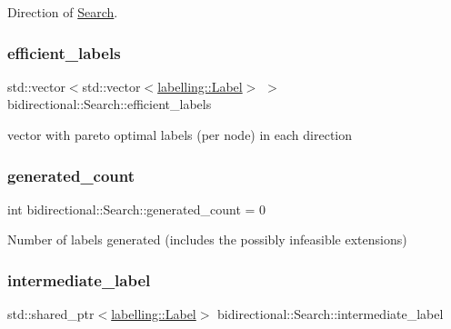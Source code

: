 Direction of \hyperlink{classbidirectional_1_1Search}{Search}. 

\mbox{\label{classbidirectional_1_1Search_aa9159c191cdef5d5555614b9efcb8dc5}} 
\subsubsection{\texorpdfstring{efficient\+\_\+labels}{efficient\_labels}}
{\footnotesize\ttfamily std\+::vector$<$std\+::vector$<$\hyperlink{classlabelling_1_1Label}{labelling\+::\+Label}$>$ $>$ bidirectional\+::\+Search\+::efficient\+\_\+labels}



vector with pareto optimal labels (per node) in each direction 

\mbox{\label{classbidirectional_1_1Search_a3a9007631e48d796e85ae2cfc3a247ab}} 
\subsubsection{\texorpdfstring{generated\+\_\+count}{generated\_count}}
{\footnotesize\ttfamily int bidirectional\+::\+Search\+::generated\+\_\+count = 0}



Number of labels generated (includes the possibly infeasible extensions) 

\mbox{\label{classbidirectional_1_1Search_aa7996593da90536ffce5cb681dc26a9b}} 
\subsubsection{\texorpdfstring{intermediate\+\_\+label}{intermediate\_label}}
{\footnotesize\ttfamily std\+::shared\+\_\+ptr$<$\hyperlink{classlabelling_1_1Label}{labelling\+::\+Label}$>$ bidirectional\+::\+Search\+::intermediate\+\_\+label}

